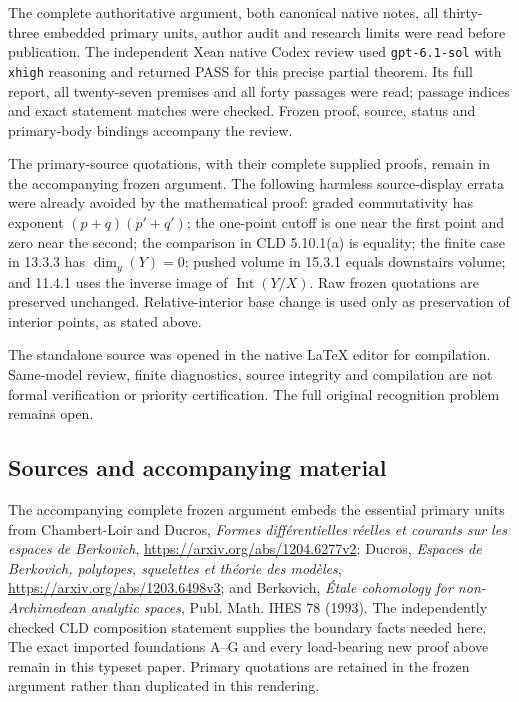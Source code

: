 \documentclass[
  10pt,
]{article}
\begin{document}
The complete authoritative argument, both canonical native notes,
all thirty-three embedded primary units, author audit and research limits
were read before publication. The independent Xean native Codex review
used \texttt{gpt-6.1-sol} with \texttt{xhigh} reasoning and returned
PASS for this precise partial theorem. Its full report, all twenty-seven
premises and all forty passages were read; passage indices and exact
statement matches were checked. Frozen proof, source, status and
primary-body bindings accompany the review.

The primary-source quotations, with their complete supplied proofs,
remain in the accompanying frozen argument. The following harmless
source-display errata were already avoided by the mathematical proof:
graded commutativity has exponent $(p+q)(p'+q')$; the one-point cutoff
is one near the first point and zero near the second; the comparison in
CLD 5.10.1(a) is equality; the finite case in 13.3.3 has
$\dim_y(Y)=0$; pushed volume in 15.3.1 equals downstairs volume; and
11.4.1 uses the inverse image of $\operatorname{Int}(Y/X)$.
Raw frozen quotations are preserved unchanged. Relative-interior base
change is used only as preservation of interior points, as stated above.

The standalone source was opened in the native LaTeX editor for
compilation. Same-model review, finite diagnostics, source integrity and
compilation are not formal verification or priority certification.
The full original recognition problem remains open.

\subsection{Sources and accompanying material}

The accompanying complete frozen argument embeds the essential primary
units from Chambert-Loir and Ducros, \emph{Formes diff\'erentielles
r\'eelles et courants sur les espaces de Berkovich},
\url{https://arxiv.org/abs/1204.6277v2}; Ducros,
\emph{Espaces de Berkovich, polytopes, squelettes et th\'eorie des
mod\`eles}, \url{https://arxiv.org/abs/1203.6498v3}; and Berkovich,
\emph{\'Etale cohomology for non-Archimedean analytic spaces},
Publ. Math. IHES 78 (1993). The independently checked CLD composition
statement supplies the boundary facts needed here. The exact imported
foundations A--G and every load-bearing new proof above remain in this
typeset paper. Primary quotations are retained in the frozen argument
rather than duplicated in this rendering.
\end{document}
